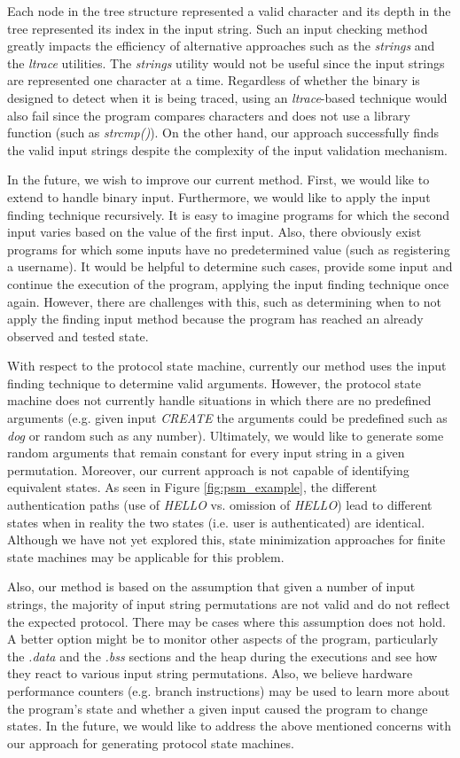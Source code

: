 \documentclass{sig-alternate-05-2015}
\begin{document}
Each node in the tree structure represented a valid character and its depth in the tree represented its index in the input string.
Such an input checking method greatly impacts the efficiency of alternative approaches such as the \textit{strings} and the \textit{ltrace} utilities.
The \textit{strings} utility would not be useful since the input strings are represented one character at a time.
Regardless of whether the binary is designed to detect when it is being traced, using an \textit{ltrace}-based technique would also fail since the program compares characters and does not use a library function (such as \textit{strcmp()}).
On the other hand, our approach successfully finds the valid input strings despite the complexity of the input validation mechanism.

In the future, we wish to improve our current method.
First, we would like to extend to handle binary input.
Furthermore, we would like to apply the input finding technique recursively.
It is easy to imagine programs for which the second input varies based on the value of the first input.
Also, there obviously exist programs for which some inputs have no predetermined value (such as registering a username).
It would be helpful to determine such cases, provide some input and continue the execution of the program, applying the input finding technique once again.
However, there are challenges with this, such as determining when to not apply the finding input method because the program has reached an already observed and tested state.

With respect to the protocol state machine, currently our method uses the input finding technique to determine valid arguments.
However, the protocol state machine does not currently handle situations in which there are no predefined arguments (e.g. given input \textit{CREATE} the arguments could be predefined such as \textit{dog} or random such as any number).
Ultimately, we would like to generate some random arguments that remain constant for every input string in a given permutation.
Moreover, our current approach is not capable of identifying equivalent states.
As seen in Figure \ref{fig:psm_example}, the different authentication paths (use of \textit{HELLO} vs. omission of \textit{HELLO}) lead to different states when in reality the two states (i.e. user is authenticated) are identical.
Although we have not yet explored this, state minimization approaches for finite state machines may be applicable for this problem.

Also, our method is based on the assumption that given a number of input strings, the majority of input string permutations are not valid and do not reflect the expected protocol.
There may be cases where this assumption does not hold.
A better option might be to monitor other aspects of the program, particularly the \textit{.data} and the \textit{.bss} sections and the heap during the executions and see how they react to various input string permutations.
Also, we believe hardware performance counters (e.g. branch instructions) may be used to learn more about the program's state and whether a given input caused the program to change states.
In the future, we would like to address the above mentioned concerns with our approach for generating protocol state machines.
\end{document}
